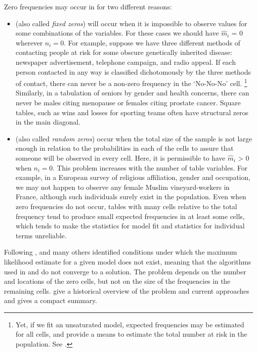 \documentclass[11pt]{book}\usepackage[]{graphicx}\usepackage[]{color}
\begin{document}
Zero frequencies may occur in \ctabs for two different reasons:
\begin{itemize}
\item {} (also called \emph{fixed zeros}) will occur when it is impossible to observe
values for some combinations of the variables.
For these cases we should have $\widehat{m}_i$ = 0 wherever $n_i=0$.
For example, suppose we have three different methods of contacting
people at risk for some obscure genetically inherited disease:
newspaper advertisement, telephone campaign, and radio appeal.
If each person contacted in any way is classified dichotomously
by the three methods of contact, there can never be a non-zero
frequency in the `No-No-No' cell.%
\footnote{Yet, if we fit an unsaturated model, expected frequencies
may be estimated for all cells, and provide a means to estimate
the total number at risk in the population.
See \citet[Section 5.4]{Lindsey:95}.}
Similarly, in a tabulation of seniors by
gender and health concerns, there
can never be males citing menopause or females citing prostate cancer.
Square tables, such as wins and losses for sporting teams often have
structural zeros in the main diagonal.

\item {} (also called \emph{random zeros})
occur when the total size of the sample is not large enough in relation to the probabilities in each of the cells to assure that someone will be observed
in every cell. Here, it is permissible to have $\widehat{m}_i$ > 0 when $n_i=0$.
This problem increases with the number of table variables.
For example, in a European survey of religious affiliation, gender and occupation,
we may not happen to observe any female Muslim vineyard-workers in France, although such individuals surely exist in the population.
Even when zero frequencies do not occur, tables with many cells relative to
the total frequency tend to produce small expected frequencies in at
least some cells, which tends to make  the \GSQ statistics for model fit
and \LR statistics for individual terms unreliable.
\end{itemize}

Following \citet{Birch:1963}, \citet{Haberman:74} and many others \citep[e.g.,][]{Bishop-etal:75}
identified conditions under which the maximum likelihood estimate for
a given \loglin model does not exist, meaning that the algorithms used in
 and  do not converge to a solution.
The problem depends on the number and locations of the zero cells, but not on the
size of the frequencies in the remaining cells.
\citet{FienbergAlessandro:2007} give a historical overview of the problem
and current approaches and \citet[\S 10.6]{Agresti:2013} gives a compact
summary.
\end{document}

